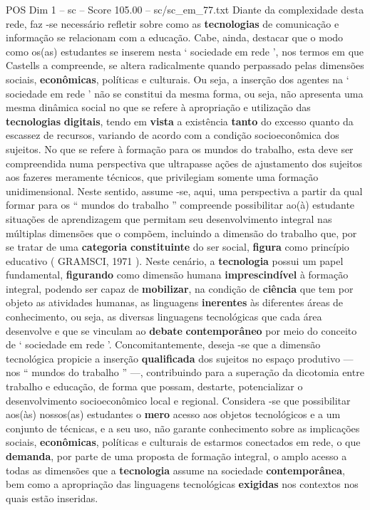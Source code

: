 \begin{textsample}{POS Dim 1 – sc – Score 105.00 – sc/sc\_em\_77.txt}
Diante da complexidade desta rede, faz -se necessário refletir sobre como as \textbf{tecnologias} de comunicação e informação se relacionam com a educação.
Cabe, ainda, destacar que o modo como os(as) estudantes se inserem nesta ‘ sociedade em rede ’, nos termos em que Castells a compreende, se altera radicalmente quando perpassado pelas dimensões sociais, \textbf{econômicas}, políticas e culturais.
Ou seja, a inserção dos agentes na ‘ sociedade em rede ’ não se constitui da mesma forma, ou seja, não apresenta uma mesma dinâmica social no que se refere à apropriação e utilização das \textbf{tecnologias} \textbf{digitais}, tendo em \textbf{vista} a existência \textbf{tanto} do excesso quanto da escassez de recursos, variando de acordo com a condição socioeconômica dos sujeitos.
No que se refere à formação para os mundos do trabalho, esta deve ser compreendida numa perspectiva que ultrapasse ações de ajustamento dos sujeitos aos fazeres meramente técnicos, que privilegiam somente uma formação unidimensional.
Neste sentido, assume -se, aqui, uma perspectiva a partir da qual formar para os “ mundos do trabalho ” compreende possibilitar ao(à) estudante situações de aprendizagem que permitam seu desenvolvimento integral nas múltiplas dimensões que o compõem, incluindo a dimensão do trabalho que, por se tratar de uma \textbf{categoria} \textbf{constituinte} do ser social, \textbf{figura} como princípio educativo ( GRAMSCI, 1971 ).
Neste cenário, a \textbf{tecnologia} possui um papel fundamental, \textbf{figurando} como dimensão humana \textbf{imprescindível} à formação integral, podendo ser capaz de \textbf{mobilizar}, na condição de \textbf{ciência} que tem por objeto as atividades humanas, as linguagens \textbf{inerentes} às diferentes áreas de conhecimento, ou seja, as diversas linguagens tecnológicas que cada área desenvolve e que se vinculam ao \textbf{debate} \textbf{contemporâneo} por meio do conceito de ‘ sociedade em rede ’.
Concomitantemente, deseja -se que a dimensão tecnológica propicie a inserção \textbf{qualificada} dos sujeitos no espaço produtivo — nos “ mundos do trabalho ” —, contribuindo para a superação da dicotomia entre trabalho e educação, de forma que possam, destarte, potencializar o desenvolvimento socioeconômico local e regional.
Considera -se que possibilitar aos(às) nossos(as) estudantes o \textbf{mero} acesso aos objetos tecnológicos e a um conjunto de técnicas, e a seu uso, não garante conhecimento sobre as implicações sociais, \textbf{econômicas}, políticas e culturais de estarmos conectados em rede, o que \textbf{demanda}, por parte de uma proposta de formação integral, o amplo acesso a todas as dimensões que a \textbf{tecnologia} assume na sociedade \textbf{contemporânea}, bem como a apropriação das linguagens tecnológicas \textbf{exigidas} nos contextos nos quais estão inseridas.

\end{textsample}

